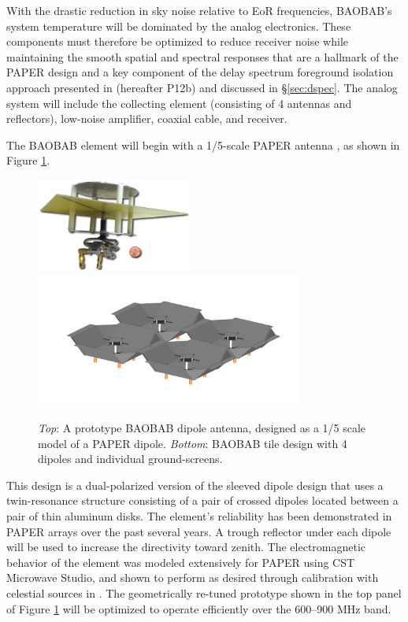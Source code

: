 \documentclass[10pt,iop]{emulateapj}
\begin{document}
With the drastic reduction in sky noise relative to EoR frequencies, BAOBAB's system temperature
will be dominated by the analog electronics.
These components must therefore be optimized to reduce
receiver noise
while maintaining the
smooth spatial and spectral responses that are a hallmark of the PAPER design
and a key component of the delay spectrum foreground isolation approach presented in 
\citet{parsons_et_al_2012b} (hereafter P12b) and discussed in \S\ref{sec:dspec}.
The analog system will include the collecting element (consisting of 4 antennas and 
reflectors), low-noise amplifier, coaxial cable, and receiver.

The BAOBAB element will begin with a 1/5-scale PAPER antenna
\citep{parsons_et_al_2010}, as shown in Figure \ref{fig:element}.  
\begin{figure}\centering
\includegraphics[width=2.0in]{baobab_ant.jpg}
\includegraphics[height=1.75in]{tile.png}
\caption{
\emph{Top}: A prototype BAOBAB dipole antenna, designed as a 1/5 scale model of a PAPER dipole.
\emph{Bottom}: BAOBAB tile design with 4 dipoles and individual ground-screens.
}
\label{fig:element}
\end{figure}
This design
is a dual-polarized version of the sleeved dipole design that uses a
twin-resonance structure consisting of a pair of crossed dipoles located
between a pair of thin aluminum disks.
The element's
reliability has been demonstrated in PAPER arrays over the past several years.
A trough reflector under each dipole will be used to increase the directivity
toward zenith.  The electromagnetic behavior of the element was modeled extensively for
PAPER using CST Microwave Studio,
and shown to perform as desired through calibration with celestial sources in
\cite{pober_et_al_2012}.  The geometrically re-tuned prototype shown in the
top panel of Figure \ref{fig:element}
will be optimized to operate efficiently over the 600--900 MHz band.
\end{document}
